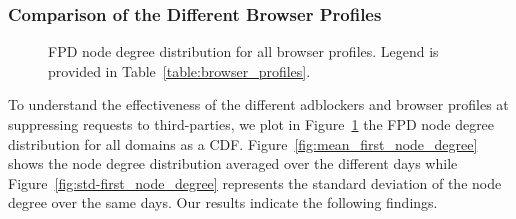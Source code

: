 \documentclass[compsoc, conference, letterpaper, 10pt, times]{IEEEtran}
\begin{document}
\subsubsection{Comparison of the Different Browser Profiles}


\begin{figure}
 \centering
 
  \hfill
 
 \caption{FPD node degree distribution for all browser profiles. Legend is provided in Table~\ref{table:browser_profiles}.}
 \label{fig:stdev_first_node_degree}
\end{figure}

To understand the effectiveness of the different adblockers and browser profiles at suppressing requests to third-parties, we plot in Figure~\ref{fig:stdev_first_node_degree} the FPD node degree distribution for all domains as a CDF. Figure~\ref{fig:mean_first_node_degree} shows the node degree distribution averaged over the different days while Figure~\ref{fig:std-first_node_degree} represents the standard deviation of the node degree over the same days. Our results indicate the following findings.
\end{document}
